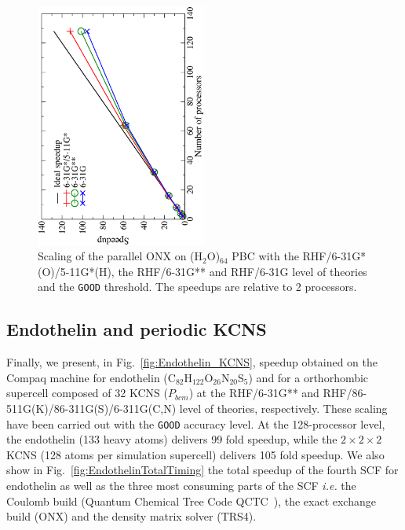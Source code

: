 \documentclass[prl,twocolumn,twocolumngrid,superbib]{revtex4} %
\begin{document}
\begin{figure}[p]
  \caption{\protect
    Scaling of the parallel ONX on (H$_2$O)$_{64}$ PBC with the RHF/6-31G*(O)/5-11G*(H),
    the RHF/6-31G** and RHF/6-31G level of theories and the {\tt GOOD} threshold. 
    The speedups are relative to 2 processors.
  }\label{fig:h2o_pbc_64}
  \includegraphics[angle=-90,width=0.5\textwidth]{h2o_pbc_64}
\end{figure}

\subsection{Endothelin and periodic KCNS}
Finally, we present, in Fig.~\ref{fig:Endothelin_KCNS}, 
speedup obtained on the Compaq machine for 
endothelin (C$_{82}$H$_{122}$O$_{26}$N$_{20}$S$_5$) and
for a orthorhombic supercell composed of 32 KCNS ($P_{bcm}$)
at the RHF/6-31G** and RHF/86-511G(K)/86-311G(S)/6-311G(C,N) 
level of theories, respectively.
These scaling have been carried out with the {\tt GOOD} accuracy level.
At the 128-processor level, the endothelin (133 heavy atoms) delivers 99 fold
speedup, while the $2\times 2\times 2$ KCNS (128 atoms per simulation supercell)
delivers 105 fold speedup. 
We also show in Fig.~\ref{fig:EndothelinTotalTiming} the total speedup 
of the fourth SCF for endothelin as well as the three most consuming parts of the SCF
{\em i.e.} the Coulomb build (Quantum Chemical Tree Code QCTC~\cite{MChallacombe97}),
the exact exchange build (ONX) and the density matrix solver (TRS4).
\end{document}
